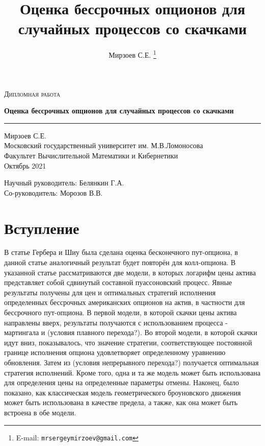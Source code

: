 \documentclass[a4paper,12pt]{article}
\author{Мирзоев С.Е.%
\thanks{E-mail: \texttt{mrsergeymirzoev@gmail.com}}}
\title{Оценка бессрочных опционов для случайных процессов со скачками}
\affil{Факультет Вычислительной Математики и Кибернетики, Московский государственный университет им. М.В.Ломоносова}
\begin{document}
\begin{titlepage}
\centering

\textsc{Дипломная работа}


{\LARGE\bfseries Оценка бессрочных опционов для случайных процессов со скачками\\}
\rule{3in}{0.4pt}


Мирзоев С.Е.\\
Московский государственный университет им. М.В.Ломоносова\\
Факультет Вычислительной Математики и Кибернетики\\
Октябрь 2021


{\small
Научный руководитель: Белянкин Г.А.\\
Со-руководитель: Морозов В.В.}


\end{titlepage}
\thispagestyle{empty}

\newpage
\tableofcontents

\newpage

\section{Вступление}

В статье Гербера и Шиу была сделана оценка бесконечного пут-опциона, в данной статье аналогичный результат будет повторён для колл-опциона. В указанной статье рассматриваются две модели, в которых логарифм цены актива представляет собой сдвинутый составной пуассоновский процесс. Явные результаты получены для цен и оптимальных стратегий исполнения определенных бессрочных американских опционов на актив, в частности для бессрочного пут-опциона. В первой модели, в которой скачки цены актива направлены вверх, результаты получаются с использованием процесса - мартингала и (условия плавного перехода?). Во второй модели, в которой скачки идут вниз, показывалось, что значение стратегии, соответствующее постоянной границе исполнения опциона удовлетворяет определенному уравнению обновления. Затем из (условия непрерывного перехода?) получается оптимальная стратегия исполнений. Кроме того, одна и та же модель может быть использована для определения цены на определенные параметры отмены. Наконец, было показано, как классическая модель геометрического броуновского движения может быть использована в качестве предела, а также, как она может быть встроена в обе модели.
\end{document}
